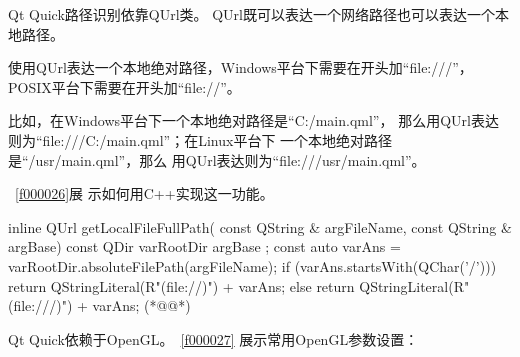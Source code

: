 Qt Quick路径识别依靠QUrl类。
QUrl既可以表达一个网络路径也可以表达一个本地路径。

使用QUrl表达一个本地绝对路径，Windows平台下需要在开头加“file:///”，
POSIX平台下需要在开头加“file://”。

比如，在Windows平台下一个本地绝对路径是“C:/main.qml”，
那么用QUrl表达则为“file:///C:/main.qml”；在Linux平台下
一个本地绝对路径是“/usr/main.qml”，那么
用QUrl表达则为“file:///usr/main.qml”。

\filesourcenumbernameone\ \ref{f000026}展
示如何用C{\sourcefonttwo{}+}{\sourcefonttwo{}+}实现这一功能。

\label{f000026}    %
\FloatBarrier                                  %
\begin{thebookfilesourceone}[escapeinside={(*@}{@*)},
caption=GoodLuck,
title=\filesourcenumbernameone \thefilesourcenumber
,firstnumber=6]
inline QUrl getLocalFileFullPath(
    const QString & argFileName,
    const QString & argBase) {
    const QDir varRootDir{ argBase };
    const auto varAns = varRootDir.absoluteFilePath(argFileName);
    if (varAns.startsWith(QChar('/'))) {
        return QStringLiteral(R"(file://)") + varAns;
    } else {
        return QStringLiteral(R"(file:///)") + varAns;
    }
}(*@\marginpar[\hfill\setlength\fboxsep{2pt}\fbox{\footnotesize{\kaishu\parbox{1em}{\setlength{\baselineskip}{2pt}\filesourcenumbernameone}}\footnotesize{\thefilesourcenumber}}]{\setlength\fboxsep{2pt}\fbox{\footnotesize{\kaishu\parbox{1em}{\setlength{\baselineskip}{2pt}\filesourcenumbernameone}}\footnotesize{\thefilesourcenumber}}}@*)\end{thebookfilesourceone}          %
\addtocounter{lstlisting}{-1}   %

Qt Quick依赖于OpenGL。\filesourcenumbernameone\ \ref{f000027}
展示常用OpenGL参数设置：

